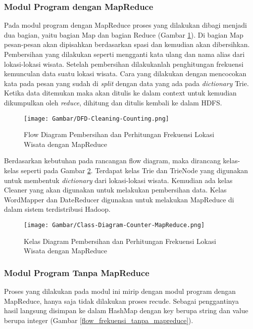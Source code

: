 \subsubsection{Modul Program dengan MapReduce}
Pada modul program dengan MapReduce proses yang dilakukan dibagi menjadi dua bagian, yaitu bagian Map dan bagian Reduce (Gambar \ref{fig:flow_frekuensi_mapreduce}). Di bagian Map pesan-pesan akan dipisahkan berdasarkan spasi dan kemudian akan dibersihkan. Pembersihan yang dilakukan seperti mengganti kata ulang dan nama alias dari lokasi-lokasi wisata. Setelah pembersihan dilakukanlah penghitungan frekuensi kemunculan data suatu lokasi wisata. Cara yang dilakukan dengan mencocokan kata pada pesan yang sudah di \textit{split} dengan data yang ada pada \textit{dictionary} Trie. Ketika data ditemukan maka akan ditulis ke dalam context untuk kemudian dikumpulkan oleh \textit{reduce}, dihitung dan ditulis kembali ke dalam HDFS. 

\begin{figure}[H]
	\centering
	\texttt{[image: Gambar/DFD-Cleaning-Counting.png]}
	\caption[Flow Diagram Pembersihan dan Perhitungan Frekuensi Lokasi Wisata dengan MapReduce]{Flow Diagram Pembersihan dan Perhitungan Frekuensi Lokasi Wisata dengan MapReduce} 
	\label{fig:flow_frekuensi_mapreduce}
\end{figure}

Berdasarkan kebutuhan pada rancangan flow diagram, maka dirancang kelas-kelas seperti pada Gambar \ref{fig:class_frekuensi_mapreduce}. Terdapat kelas Trie dan TrieNode yang digunakan untuk membentuk \textit{dictionary} dari lokasi-lokasi wisata. Kemudian ada kelas Cleaner yang akan digunakan untuk melakukan pembersihan data. Kelas WordMapper dan DateReducer digunakan untuk melakukan MapReduce di dalam sistem terdistribusi Hadoop.

\begin{figure}[H]
	\centering
	\texttt{[image: Gambar/Class-Diagram-Counter-MapReduce.png]}
	\caption[Kelas Diagram Pembersihan dan Perhitungan Frekuensi Lokasi Wisata dengan MapReduce]{Kelas Diagram Pembersihan dan Perhitungan Frekuensi Lokasi Wisata dengan MapReduce} 
	\label{fig:class_frekuensi_mapreduce}
\end{figure}

\subsubsection{Modul Program Tanpa MapReduce}
Proses yang dilakukan pada modul ini mirip dengan modul program dengan MapReduce, hanya saja tidak dilakukan proses recude. Sebagai penggantinya hasil langsung disimpan ke dalam HashMap dengan key berupa string dan value berupa integer (Gambar \ref{flow_frekuensi_tanpa_mapreduce}).

